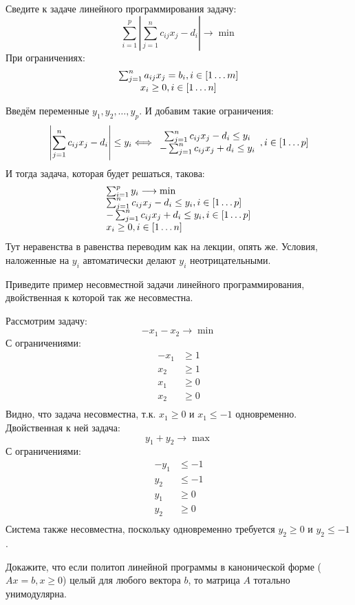 \begin{task}[2]
Сведите к задаче линейного программирования задачу:
\[
	\sum_{i = 1}^{p}{ \left| \sum_{j = 1}^{n}{c_{ij}x_j} - d_i \right| } \longrightarrow \min
\]
При ограничениях:
\[
	\begin{array}{c}
		\sum_{j = 1}^{n}{a_{ij}x_j} = b_i, i \in \left[ 1\ldots m \right] \\
		x_i \geq 0, i \in \left[ 1\ldots n \right]
	\end{array}
\]
\end{task}
\begin{solution}
Введём переменные $y_1, y_2, \ldots, y_p$. И добавим такие ограничения:
\[
	\left| \sum_{j = 1}^{n}{c_{ij}x_j} - d_i \right| \leq y_i
	\Longleftrightarrow
	\begin{array}{c}
		\sum_{j = 1}^{n}{c_{ij}x_j} - d_i \leq y_i \\
		-\sum_{j = 1}^{n}{c_{ij}x_j} + d_i \leq y_i
	\end{array}
	, i \in \left[ 1\ldots p \right]
\]
И тогда задача, которая будет решаться, такова:
\[\begin{array}{l}
	\sum_{i = 1}^{p}{y_i} \longrightarrow \min \\
	\sum_{j = 1}^{n}{c_{ij}x_j} - d_i \leq y_i, i \in \left[ 1\ldots p \right]\\
	-\sum_{j = 1}^{n}{c_{ij}x_j} + d_i \leq y_i, i \in \left[ 1\ldots p \right] \\
	x_i \geq 0, i \in \left[ 1\ldots n \right]
\end{array}\]
Тут неравенства в равенства переводим как на лекции, опять же. Условия, наложенные на $y_i$ автоматически делают $y_i$ неотрицательными. \xqed
\end{solution}

\begin{task}[3]
Приведите пример несовместной задачи линейного программирования, двойственная к которой так же несовместна.
\end{task}
\begin{solution}
Рассмотрим задачу:
\[
	-x_1 - x_2 \longrightarrow \min
\]
С ограничениями:
\begin{align*}
	-x_1 &\geq 1 \\
	x_2 &\geq 1 \\
	x_1 &\geq 0\\
	x_2 &\geq 0\\
\end{align*}
Видно, что задача несовместна, т.к. $x_1 \geq 0$ и $x_1 \leq -1$ одновременно.\\
Двойственная к ней задача:
\[
	y_1 + y_2 \longrightarrow \max
\]
С ограничениями:
\begin{align*}
	-y_1 &\leq -1 \\
	y_2 &\leq -1 \\
	y_1 &\geq 0\\
	y_2 &\geq 0\\
\end{align*}
Система также несовместна, поскольку одновременно требуется $y_2 \geq 0$ и $y_2 \leq -1$.
\xqed
\end{solution}

\begin{task}[4]
Докажите, что если политоп линейной программы в канонической форме
($Ax = b, x \geq 0$) целый для любого вектора $b$, то матрица $A$ тотально унимодулярна.
\end{task}
\begin{solution}
\end{solution}



